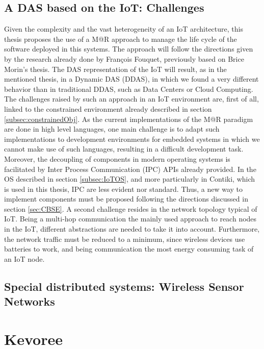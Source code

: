 \subsection{A DAS based on the IoT: Challenges}
Given the complexity and the vast heterogeneity of an IoT architecture, this thesis proposes the use of a M@R approach to manage the life cycle of the software deployed in this systems.
The approach will follow the directions given by the research already done by Fran{\c{c}}ois Fouquet\cite{fouquet2013kevoree}, previously based on Brice Morin's thesis\cite{morin2010leveraging}.
The DAS representation of the IoT will result, as in the mentioned thesis, in a Dynamic DAS (DDAS), in which we found a very different behavior than in traditional DDAS, such as Data Centers or Cloud Computing.
The challenges raised by such an approach in an IoT environment are, first of all, linked to the constrained environment already described in section \ref{subsec:constrainedObj}.
As the current implementations of the M@R paradigm are done in high level languages, one main challenge is to adapt such implementations to development environments for embedded systems in which we cannot make use of such languages, resulting in a difficult development task.
Moreover, the decoupling of components in modern operating systems is facilitated by Inter Process Communication (IPC) APIs already provided.
In the OS described in section \ref{subsec:IoTOS}, and more particularly in Contiki, which is used in this thesis, IPC are less evident nor standard.
Thus, a new way to implement components must be proposed following the directions discussed in section \ref{sec:CBSE}.
A second challenge resides in the network topology typical of IoT.
Being a multi-hop communication the mainly used approach to reach nodes in the IoT, different abstractions are needed to take it into account.
Furthermore, the network traffic must be reduced to a minimum, since wireless devices use batteries to work, and being communication the most energy consuming task of an IoT node.



\subsection{Special distributed systems: Wireless Sensor Networks}

\section{Kevoree}